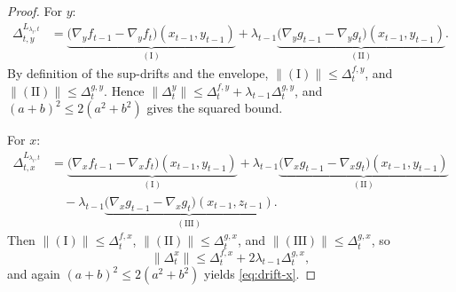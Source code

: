\documentclass{uai2026} %
\begin{document}
\begin{proof}
For $y$:
\begin{align*}
\Delta_{t,y}^{L_{\lambda_{t},t}}
&=\underbrace{\big(\nabla_y f_{t-1}-\nabla_y f_t\big)(x_{t-1},y_{t-1})}_{(\mathrm{I})}
+\lambda_{t-1}\underbrace{\big(\nabla_y g_{t-1}-\nabla_y g_t\big)(x_{t-1},y_{t-1})}_{(\mathrm{II})}.
\end{align*}
By definition of the sup-drifts and the envelope, $\|(\mathrm{I})\|\le \Delta_t^{f,y}$, and $\|(\mathrm{II})\|\le \Delta_t^{g,y}$. Hence $\|\Delta_t^y\|\le \Delta_t^{f,y}+\lambda_{t-1}\Delta_t^{g,y}$,
and $(a+b)^2\le 2(a^2+b^2)$ gives the squared bound.

For $x$:
\begin{align*}
\Delta_{t,x}^{L_{\lambda_{t},t}}
&=\underbrace{\big(\nabla_x f_{t-1}-\nabla_x f_t\big)(x_{t-1},y_{t-1})}_{(\mathrm{I})}
+\lambda_{t-1}\underbrace{\big(\nabla_x g_{t-1}-\nabla_x g_t\big)(x_{t-1},y_{t-1})}_{(\mathrm{II})}\\
&\quad-\lambda_{t-1}\underbrace{\big(\nabla_x g_{t-1}-\nabla_x g_t\big)(x_{t-1},z_{t-1})}_{(\mathrm{III})}.
\end{align*}
Then $\|(\mathrm{I})\|\le \Delta_t^{f,x}$, $\|(\mathrm{II})\|\le \Delta_t^{g,x}$, and $\|(\mathrm{III})\|\le \Delta_t^{g,x}$, so
\[
\|\Delta_t^x\|\le \Delta_t^{f,x}+2\lambda_{t-1}\Delta_t^{g,x},
\]
and again $(a+b)^2\le 2(a^2+b^2)$ yields \eqref{eq:drift-x}.
\end{proof}
\end{document}
